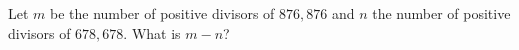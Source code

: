 Let $m$ be the number of positive divisors of $876{,}876$ and $n$ the number of positive divisors of $678{,}678$. What is $m-n$?
